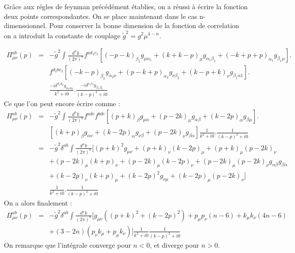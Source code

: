 \documentclass[a4paper,11pt]{article}
\theoremstyle{plain}
\theoremstyle{definition}
\theoremstyle{remark}
\numberwithin{equation}{section}
\numberwithin{equation}{subsection}
\numberwithin{figure}{section}
\begin{document}
\noindent
Grâce aux régles de feynman précédément établies, on a réussi à écrire la fonction deux points correspondantes. On se place maintenant 
dans le cas n-dimenssionnel. Pour conserver la bonne dimension de la fonction de correlation on a introduit la constante de 
couplage $\tilde{g}^{2} = g^{2} \mu^{4-n}$.

\begin{eqnarray}
 \Pi^{ab}_{\mu\nu}(p) &=& -\tilde{g}^{2}  \int \frac{d^{n}k}{\left(2\pi\right)^n} f^{ad_{1}c_{1}} 
\left[(-p-k)_{\beta_{1}}g_{\mu\alpha_{1}}  +  (k+k-p)_{\mu}g_{\alpha_{1}\beta_{1}}  +  (-k+p+p)_{\alpha_{1}}g_{\beta_{1}\mu}  \right]. \nonumber \\
&& f^{d_{2}bc_{2}} \left[(-k-p)_{\beta_{2}}g_{\alpha_{2}\nu}  +  (p-k+p)_{\alpha_{2}}g_{\nu\beta_{2}}  
+  (k-p+k)_{\nu}g_{\beta_{1}\alpha{1}}  \right].\nonumber  \\
&& \frac{-i\delta^{d_{1}d_{2}}g_{\alpha_{1}\alpha_{2}}}{k^2+i0} . \frac{-i\delta^{c_{1}c_{2}}g_{\beta_{1}\beta_{2}}}{(k-p)^2+i0} 
\end{eqnarray}
Ce que l'on peut encore écrire comme :
\begin{eqnarray}
 \Pi^{ab}_{\mu\nu}(p)      &=&  -\tilde{g}^{2} \int \frac{d^{n}k}{\left(2\pi\right)^n} f^{adc} f^{bdc}
\left[  (p+k)_{\beta}g_{\mu\alpha}  +  (p-2k)_{\mu}g_{\alpha\beta}  +  (k-2p)_{\alpha}g_{\beta\mu}  \right].   \nonumber  \\
&& \left[  (k+p)_{\beta} g_{\alpha\nu}  +  (k-2p)_{\alpha}g_{\nu\beta}  +  (p-2k)_{\nu}g_{\beta\alpha}  \right]  
\frac{1}{k^2+i0} . \frac{1}{(k-p)^2+i0}\\
                      &=&  -\tilde{g}^{2}  \delta^{ab} \int \frac{d^{n}k}{\left(2\pi\right)^n} 
[  (p+k)^{2}g_{\mu\nu}  +  (p+k)_{\nu}(k-2p)_{\mu}  +  (p+k)_{\mu}(p-2k)_{\nu}  \nonumber  \\
&&  +  (p-2k)_{\mu}(k+p)_{\nu}  +  (p-2k)_{\mu}(k-2p)_{\nu}  +  (p-2k)_{\mu}(p-2k)_{\nu}g_{\alpha\beta}g_{\beta\alpha}  \nonumber  \\
&&  +  (k-2p)_{\nu}(k+p)_{\mu}  +  (k-2p)^2g_{\nu\mu}  +  (k-2p)_{\mu}(p-2k)_{\nu}  ] \nonumber  \\
&&  \frac{1}{k^2+i0} . \frac{1}{(k-p)^2+i0}
\end{eqnarray}
On a alors finalement :
\begin{eqnarray}
 \Pi^{ab}_{\mu\nu}(p) &=&  -\tilde{g}^{2}  \delta^{ab} \int \frac{d^{n}k}{\left(2\pi\right)^n} 
[g_{\mu\nu}\left((p+k)^{2} +(k-2p)^2\right) + p_{\mu}p_{\nu}\left(n-6\right)+k_{\mu}k_{\nu}\left(4n-6\right)  \nonumber  \\
&&  +(3-2n)(p_{\nu}k_{\mu}+p_{\mu}k_{\nu})]\frac{1}{k^2+i0}\frac{1}{(k-p)^2+i0}
\end{eqnarray}
On remarque que l'intégrale converge pour $n<0$, et diverge pour $n>0$.\\
\end{document}
